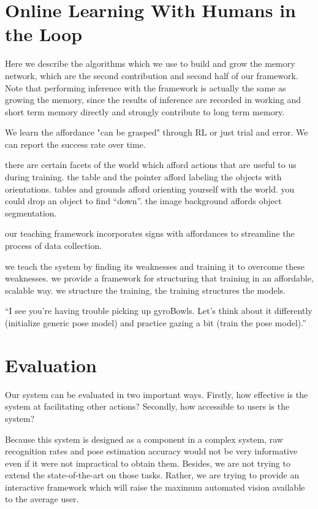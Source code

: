 \documentclass[conference]{IEEEtran}
\begin{document}
\section{Online Learning With Humans in the Loop}
Here we describe the algorithms which we use to build and grow the memory network,
which are the second contribution and second half of our framework.
Note that performing inference with the framework is actually the same as growing the
memory, since the results of inference are recorded in working and short term memory
directly and strongly contribute to long term memory.

We learn the affordance "can be grasped" through RL or just trial and error.
We can report the success rate over time.

there are certain facets of the world which afford actions that are useful to us during 
training. the table and the pointer afford labeling the objects with orientations. 
tables and grounds afford orienting yourself with the world. you could drop an object to 
find “down”. the image background affords object segmentation.

our teaching framework incorporates signs with affordances to streamline the process 
of data collection.

we teach the system by finding its weaknesses and training it to overcome these 
weaknesses. we provide a framework for structuring that training in an affordable, 
scalable way.  we structure the training, the training structures the models.

“I see you’re having trouble picking up gyroBowls. Let’s think about it differently 
(initialize generic pose model) and practice gazing a bit (train the pose model).”


\section{Evaluation}
Our system can be evaluated in two important ways. Firstly, how effective is 
the system at facilitating other actions? Secondly, how accessible to users is the system?

Because this system is designed as a component in a complex system, raw recognition rates
and pose estimation accuracy would not be very informative even if it were not impractical to
obtain them.  Besides, we are not trying to extend the state-of-the-art on those tasks. Rather,
we are trying to provide an interactive framework which will raise the maximum automated vision
available to the average user.
\end{document}
